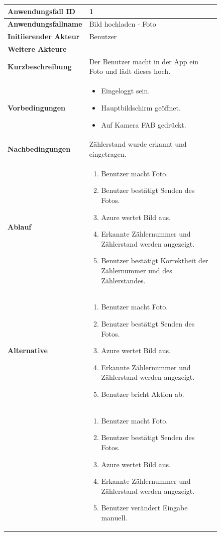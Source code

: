\begin{figure}[h]
	\centering
	\begin{tabularx}{\textwidth}{ X | X }
		\textbf{Anwendungsfall ID} & 1 \\ \hline
		\textbf{Anwendungsfallname} & Bild hochladen  - Foto \\ \hline
		\textbf{Initiierender Akteur} & Benutzer \\ \hline
		\textbf{Weitere Akteure} & - \\ \hline
		\textbf{Kurzbeschreibung} & Der Benutzer macht in der App ein Foto und lädt dieses hoch.   \\ \hline
		\textbf{Vorbedingungen} & 
		\begin {itemize}
			\item Eingeloggt sein. 
			\item Hauptbildschirm geöffnet.
			\item Auf Kamera FAB gedrückt.
		\end{itemize} \\ \hline
		\textbf{Nachbedingungen} & Zählerstand wurde erkannt und eingetragen.  \\ \hline
		\textbf{Ablauf} &
		\begin{enumerate}
			\item Benutzer macht Foto.
			\item Benutzer bestätigt Senden des Fotos.
			\item Azure wertet Bild aus.
			\item Erkannte Zählernummer und Zählerstand werden angezeigt.
			\item Benutzer bestätigt Korrektheit der Zählernummer und des Zählerstandes.
		\end{enumerate} \\ \hline
		\textbf{Alternative} &
		\begin{enumerate}
			\item Benutzer macht Foto.
			\item Benutzer bestätigt Senden des Fotos.
			\item Azure wertet Bild aus.
			\item Erkannte Zählernummer und Zählerstand werden angezeigt.
			\item Benutzer bricht Aktion ab.
		\end{enumerate} \\ &
		\begin{enumerate}
			\item Benutzer macht Foto.
			\item Benutzer bestätigt Senden des Fotos.
			\item Azure wertet Bild aus.
			\item Erkannte Zählernummer und Zählerstand werden angezeigt.
			\item Benutzer verändert Eingabe manuell.
		\end{enumerate} \\


	\end{tabularx}
\end{figure}

